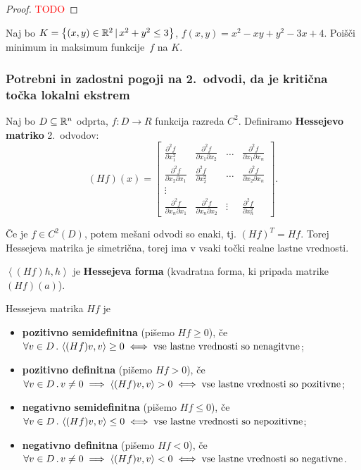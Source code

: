 \begin{proof}
    \textcolor{red}{TODO}
\end{proof}

\begin{zgled}
    Naj bo $K = \left\{(x, y) \in \mathbb{R}^2 \,|\, x^2+y^2 \leq 3\right\}$, $f(x, y) = x^2 - xy + y^2 - 3x +4$. 
    Poišči minimum in maksimum funkcije~$f$ na $K$.
\end{zgled}

\subsubsection{Potrebni in zadostni pogoji na 2.\ odvodi, da je kritična točka lokalni ekstrem}
Naj bo $D \subseteq \mathbb{R}^n$ odprta, $f: D \to R$ funkcija razreda $C^2$. Definiramo \textbf{Hessejevo matriko} 2.\ odvodov:
$$(Hf) (x) = \begin{bmatrix}
    \frac{\partial^2 f}{\partial x_1^2} & \frac{\partial^2 f}{\partial x_1 \partial x_2} & \ldots & \frac{\partial^2 f}{\partial x_1 \partial x_n} \\
    \frac{\partial^2 f}{\partial x_2 \partial x_1} & \frac{\partial^2 f}{\partial x_2^2} & \ldots & \frac{\partial^2 f}{\partial x_2 \partial x_n} \\
    \vdots & & & \\
    \frac{\partial^2 f}{\partial x_n \partial x_1} & \frac{\partial^2 f}{\partial x_n \partial x_2} & \vdots & \frac{\partial^2 f}{\partial x_n^2}
\end{bmatrix}.$$

\begin{opomba}
    Če je $f \in C^2(D)$, potem mešani odvodi so enaki, tj. $(Hf)^T = Hf$. Torej Hessejeva matrika je simetrična, torej ima v vsaki točki realne lastne vrednosti. 
\end{opomba}

$\left\langle (Hf)h, h\right\rangle$ je \textbf{Hessejeva forma} (kvadratna forma, ki pripada matrike $(Hf)(a)$).

\begin{definicija}
    Hessejeva matrika $Hf$ je
    \begin{itemize}
        \item \textbf{pozitivno semidefinitna} (pišemo $Hf \geq 0$), če $\forall v \in D \,.\, \left\langle (Hf)v, v\right\rangle \geq 0 \iff \text{vse lastne vrednosti so nenagitvne}$;
        \item \textbf{pozitivno definitna} (pišemo $Hf > 0$), če $\forall v \in D \,.\, v \neq 0 \implies \left\langle (Hf)v, v\right\rangle > 0 \iff \text{vse lastne vrednosti so pozitivne}$;
        \item \textbf{negativno semidefinitna} (pišemo $Hf \leq 0$), če $\forall v \in D \,.\,\left\langle (Hf)v, v\right\rangle \leq 0 \iff \text{vse lastne vrednosti so nepozitivne}$;
        \item \textbf{negativno definitna} (pišemo $Hf < 0$), če $\forall v \in D \,.\, v \neq 0 \implies \left\langle (Hf)v, v\right\rangle < 0 \iff \text{vse lastne vrednosti so negativne}$.
    \end{itemize}
\end{definicija}

